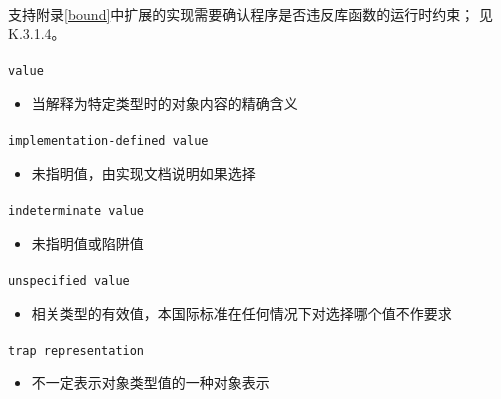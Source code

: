 \paragraph{}
\notes 支持附录\ref{bound}中扩展的实现需要确认程序是否违反库函数的运行时约束；
见K.3.1.4。

\paragraph{}
\texttt{value}
\begin{itemize}
  \item[]{当解释为特定类型时的对象内容的精确含义}
\end{itemize}

\paragraph{}
\texttt{implementation-defined value}
\begin{itemize}
  \item[]{未指明值，由实现文档说明如果选择}
\end{itemize}

\paragraph{}
\texttt{indeterminate value}
\begin{itemize}
  \item[]{未指明值或陷阱值}
\end{itemize}

\paragraph{}
\texttt{unspecified value}
\begin{itemize}
  \item[]{相关类型的有效值，本国际标准在任何情况下对选择哪个值不作要求}
\end{itemize}

\paragraph{}
\texttt{trap representation}
\begin{itemize}
  \item[]{不一定表示对象类型值的一种对象表示}
\end{itemize}

